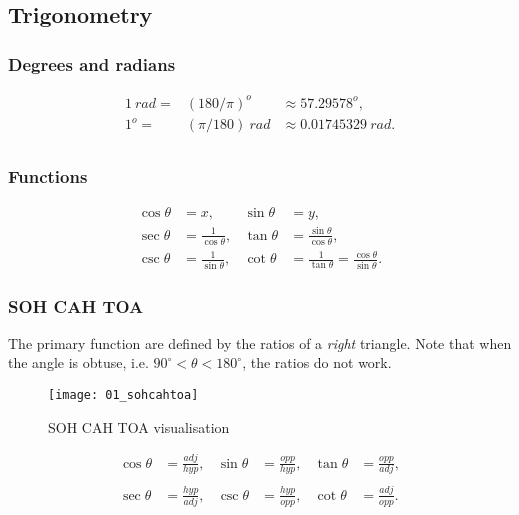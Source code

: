 \subsection{Trigonometry}

\subsubsection{Degrees and radians}

\[
\begin{array}{rll}
{1\ {rad} =} & {\left( 180/\pi \right)^{o}} & {\approx 57.29578^{o},} \\
{1^{o} =} & {\left( \pi/180 \right)\ {rad}} & {\approx 0.01745329\ {rad}.} \\
\end{array}
\]


\subsubsection{Functions}

\begin{align*}
\cos\theta &=x, &\sin\theta &=y, \\
\sec\theta &=\frac{1}{\cos\theta}, &\tan\theta &=\frac{\sin\theta}{\cos\theta}, \\
\csc\theta &=\frac{1}{\sin\theta}, &\cot\theta &=\frac{1}{\tan\theta}=\frac{\cos\theta}{\sin\theta}.
\end{align*}

\subsubsection{SOH CAH TOA}

The primary function are defined by the ratios of a \emph{right} triangle. Note that when the angle is obtuse, i.e. $90^\circ < \theta < 180^\circ$, the ratios do not work.

\begin{figure}[H]
\centering
    \texttt{[image: 01\_sohcahtoa]}
\caption{SOH CAH TOA visualisation}
\label{fig:soh-cah-toa-visualization}
\end{figure}

\[\begin{matrix}
{\cos\theta} & {= \frac{\mathit{a}\mathit{d}\mathit{j}}{\mathit{h}\mathit{y}\mathit{p}},} & {\sin\theta} & {= \frac{\mathit{o}\mathit{p}\mathit{p}}{\mathit{h}\mathit{y}\mathit{p}},} & {\tan\theta} & {= \frac{\mathit{o}\mathit{p}\mathit{p}}{\mathit{a}\mathit{d}\mathit{j}},} \\
 & & & & & \\
{\sec\theta} & {= \frac{\mathit{h}\mathit{y}\mathit{p}}{\mathit{a}\mathit{d}\mathit{j}},} & {\csc\theta} & {= \frac{\mathit{h}\mathit{y}\mathit{p}}{\mathit{o}\mathit{p}\mathit{p}},} & {\cot\theta} & {= \frac{\mathit{a}\mathit{d}\mathit{j}}{\mathit{o}\mathit{p}\mathit{p}}.} \\
\end{matrix}\]

